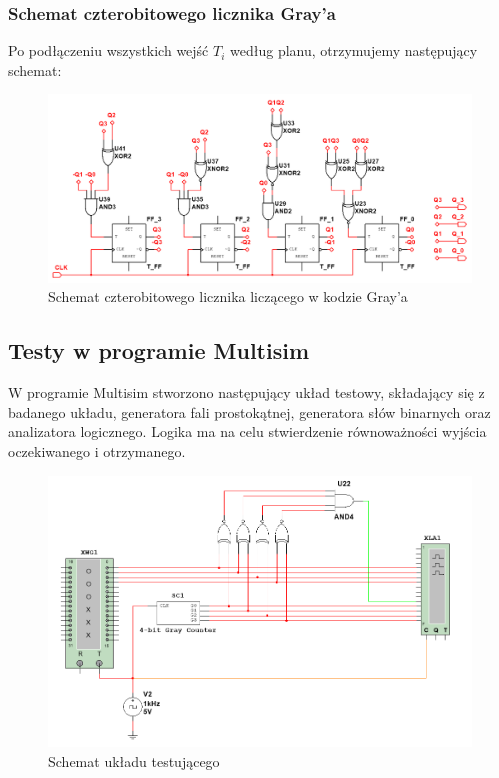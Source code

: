 \documentclass[12pt,a4paper,table]{article}
\begin{document}
    \pagebreak
    \subsubsection{Schemat czterobitowego licznika Gray'a}
    Po podłączeniu wszystkich wejść $T_i$ według planu, otrzymujemy następujący schemat:
    \begin{figure}[h]
        \centering
        \includegraphics[width=0.85\linewidth]{images/gray_schematic.PNG}
        \caption{Schemat czterobitowego licznika liczącego w kodzie Gray'a}
        \label{fig:gray_schemat}
    \end{figure}

    \subsection{Testy w programie Multisim}
    W programie Multisim stworzono następujący układ testowy, składający się z badanego układu, 
    generatora fali prostokątnej, generatora słów binarnych oraz analizatora logicznego. Logika
    ma na celu stwierdzenie równoważności wyjścia oczekiwanego i otrzymanego.
    \begin{figure}[h]
        \centering
        \includegraphics[width=\linewidth]{images/gray_test.PNG}
        \caption{Schemat układu testującego}
        \label{fig:gray_test}
    \end{figure}
\end{document}

